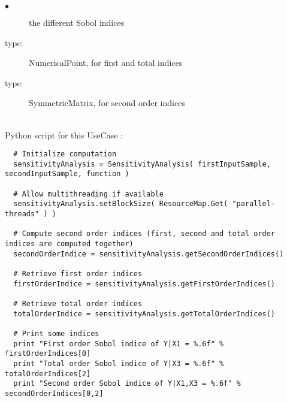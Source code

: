 {
  \begin{description}
  \item[$\bullet$] the different Sobol indices
  \item[type:] NumericalPoint, for first and total indices
  \item[type:] SymmetricMatrix, for second order indices
  \end{description}
}
\textspace\\
Python script for this UseCase :

\begin{lstlisting}
  # Initialize computation
  sensitivityAnalysis = SensitivityAnalysis( firstInputSample, secondInputSample, function )

  # Allow multithreading if available
  sensitivityAnalysis.setBlockSize( ResourceMap.Get( "parallel-threads" ) )

  # Compute second order indices (first, second and total order indices are computed together)
  secondOrderIndice = sensitivityAnalysis.getSecondOrderIndices()

  # Retrieve first order indices
  firstOrderIndice = sensitivityAnalysis.getFirstOrderIndices()

  # Retrieve total order indices
  totalOrderIndice = sensitivityAnalysis.getTotalOrderIndices()

  # Print some indices
  print "First order Sobol indice of Y|X1 = %.6f" % firstOrderIndices[0]
  print "Total order Sobol indice of Y|X3 = %.6f" % totalOrderIndices[2]
  print "Second order Sobol indice of Y|X1,X3 = %.6f" % secondOrderIndices[0,2]

\end{lstlisting}

